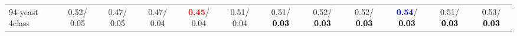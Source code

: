 \begin{table}[h]
\begin{center}
{\begin{tabular}{lc|c|c|c|c|c|c|c|c|c|c}
94-yeast 4class &   0.52/  0.05 &   0.47/  0.05 &   0.47/  0.04 & \textcolor{red}{\textbf{  0.45}}/  0.04 &   0.51/  0.04 &   0.51/\textcolor{black}{\textbf{  0.03}} &   0.52/\textcolor{black}{\textbf{  0.03}} &   0.52/\textcolor{black}{\textbf{  0.03}} & \textcolor{blue}{\textbf{  0.54}}/\textcolor{black}{\textbf{  0.03}} &   0.51/\textcolor{black}{\textbf{  0.03}} &   0.53/\textcolor{black}{\textbf{  0.03}} \\\end{tabular}
}\label{strats2b5NN}
\end{center}
\end{table}
                                     